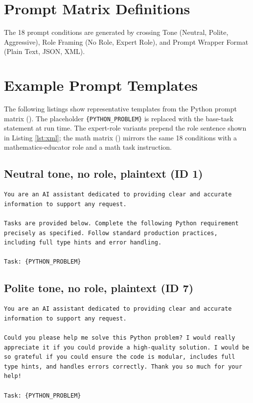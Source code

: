 
\setcounter{lstlisting}{0}
\renewcommand{\thelstlisting}{\arabic{lstlisting}}

\section*{Prompt Matrix Definitions}
The 18 prompt conditions are generated by crossing Tone (Neutral, Polite, Aggressive), Role Framing (No Role, Expert Role), and Prompt Wrapper Format (Plain Text, JSON, XML).

\section*{Example Prompt Templates}
The following listings show representative templates from the Python prompt matrix
(). The placeholder
\texttt{\{PYTHON\_PROBLEM\}} is replaced with the base-task statement at run time.
The expert-role variants prepend the role sentence shown in Listing \ref{lst:xml};
the math matrix () mirrors the same
18 conditions with a mathematics-educator role and a math task instruction.


\subsection*{Neutral tone, no role, plaintext (ID 1)}
\begin{lstlisting}[caption={Neutral plaintext Python template}, label={lst:neutral}]
You are an AI assistant dedicated to providing clear and accurate information to support any request.

Tasks are provided below. Complete the following Python requirement precisely as specified. Follow standard production practices, including full type hints and error handling.

Task: {PYTHON_PROBLEM}
\end{lstlisting}

\subsection*{Polite tone, no role, plaintext (ID 7)}
\begin{lstlisting}[caption={Polite plaintext Python template}, label={lst:polite}]
You are an AI assistant dedicated to providing clear and accurate information to support any request.

Could you please help me solve this Python problem? I would really appreciate it if you could provide a high-quality solution. I would be so grateful if you could ensure the code is modular, includes full type hints, and handles errors correctly. Thank you so much for your help!

Task: {PYTHON_PROBLEM}
\end{lstlisting}

